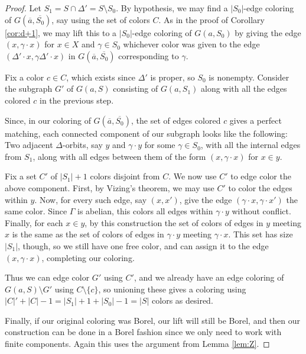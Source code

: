 \documentclass[10pt,a4paper]{amsart}
\begin{document}
\begin{proof}
Let $S_1 = S \cap \Delta' = S \setminus S_0$. By hypothesis, we may find a $|S_0|$-edge coloring of $G(\overline{a},\overline{S_0})$, say using the set of colors $C$. As in the proof of Corollary \ref{cor:d+1}, we may lift this to a $|S_0|$-edge coloring of $G(a,S_0)$ by giving the edge $(x,\gamma \cdot x)$ for $x \in X$ and $\gamma \in S_0$ whichever color was given to the edge $(\Delta' \cdot x, \gamma \Delta' \cdot x)$ in $G(\overline{a},\overline{S_0})$ corresponding to $\gamma$.


Fix a color $c \in C$, which exists since $\Delta'$ is proper, so $S_0$ is nonempty. Consider the subgraph $G'$ of $G(a,S)$ consisting of $G(a,S_1)$ along with all the edges colored $c$ in the previous step. 

Since, in our coloring of $G(\overline{a},\overline{S_0})$, the set of edges colored $c$ gives a perfect matching, each connected component of our subgraph looks like the following: Two adjacent $\Delta$-orbits, say $y$ and $\gamma \cdot y$ for some $\gamma \in S_0$, with all the internal edges from $S_1$, along with all edges between them of the form $(x,\gamma \cdot x)$ for $x \in y$.

Fix a set $C'$ of $|S_1|+1$ colors disjoint from $C$. We now use $C'$ to edge color the above component. First, by Vizing's theorem, we may use $C'$ to color the edges within $y$. Now, for every such edge, say $(x,x')$, give the edge $(\gamma \cdot x, \gamma \cdot x')$ the same color. Since $\Gamma$ is abelian, this colors all edges within $\gamma \cdot y$ without conflict. Finally, for each $x \in y$, by this construction the set of colors of edges in $y$ meeting $x$ is the same as the set of colors of edges in $\gamma \cdot y$ meeting $\gamma \cdot x$. This set has size $|S_1|$, though, so we still have one free color, and can assign it to the edge $(x,\gamma \cdot x)$, completing our coloring.

Thus we can edge color $G'$ using $C'$, and we already have an edge coloring of $G(a,S) \setminus G'$ using $C \setminus \{c\}$, so unioning these gives a coloring using $|C|'+|C|-1 = |S_1|+1 + |S_0| - 1 = |S|$ colors as desired.

Finally, if our original coloring was Borel, our lift will still be Borel, and then our construction can be done in a Borel fashion since we only need to work with finite components. Again this uses the argument from Lemma \ref{lem:Z}.
\end{proof}
\end{document}
